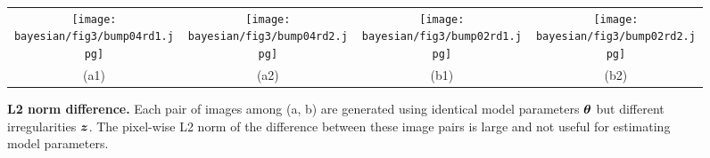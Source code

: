 \begin{figure}[!ht]
	\centering
	\setlength{\resLen}{0.24\columnwidth}
	\addtolength{\tabcolsep}{-5pt}
	\begin{tabular}{cccc}
		\texttt{[image: bayesian/fig3/bump04rd1.jpg]} &
		\texttt{[image: bayesian/fig3/bump04rd2.jpg]} &
		\texttt{[image: bayesian/fig3/bump02rd1.jpg]} &
		\texttt{[image: bayesian/fig3/bump02rd2.jpg]} \\
		(a1) & (a2) & (b1) & (b2)
	\end{tabular}
	\caption[L2 norm difference]{\label{fig:bayesian:sum_func}
		\textbf{L2 norm difference.} Each pair of images among (a, b) are generated using identical model parameters $\bm\theta$ but different irregularities $\bm{z}$. The pixel-wise L2 norm of the difference between these image pairs is large and not useful for estimating model parameters.
	}
\end{figure}